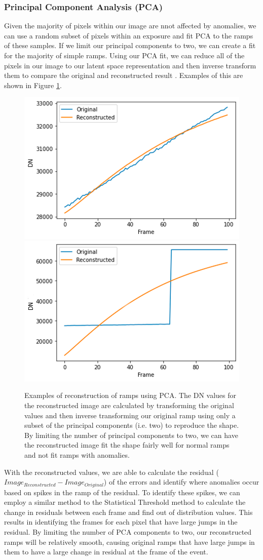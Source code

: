 \subsubsection{Principal Component Analysis (PCA)}
Given the majority of pixels within our image are nnot affected by anomalies, we can use a random subset of pixels within an exposure and fit PCA to the ramps of these samples.
If we limit our principal components to two, we can create a fit for the majority of simple ramps. 
Using our PCA fit, we can reduce all of the pixels in our image to our latent space representation and then inverse transform them to compare the original and reconstructed result \parencite{wold1987principal}.
Examples of this are shown in Figure \ref{rst/fig:PCA}. 

\begin{figure}
    \centering
    \includegraphics[width=0.49\linewidth]{figs/rst/PCA_Good.png}
    \includegraphics[width=0.49\linewidth]{figs/rst/PCA_Bad.png}
    \caption[Examples of using PCA to Ramp Jumps Through Reconstruction for WFI Detector Data]{Examples of reconstruction of ramps using PCA. The DN values for the reconstructed image are calculated by transforming the original values and then inverse transforming our original ramp using only a subset of the principal components (i.e. two) to reproduce the shape. By limiting the number of principal components to two, we can have the reconstructed image fit the shape fairly well for normal ramps and not fit ramps with anomalies.}
    \label{rst/fig:PCA}
\end{figure}

With the reconstructed values, we are able to calculate the residual ($Image_{Reconstructed} - Image_{Original}$) of the errors and identify where anomalies occur based on spikes in the ramp of the residual. 
To identify these spikes, we can employ a similar method to the Statistical Threshold method to calculate the change in residuals between each frame and find out of distribution values. 
This results in identifying the frames for each pixel that have large jumps in the residual. 
By limiting the number of PCA components to two, our reconstructed ramps will be relatively smooth, causing original ramps that have large jumps in them to have a large change in residual at the frame of the event.

